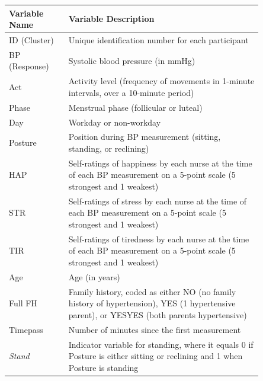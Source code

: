 \documentclass[12pt,twoside,letterpaper]{article}
\theoremstyle{definition}
\theoremstyle{definition}
\begin{document}
\begin{table} 
    \centering\begin{tabular}{|p{0.2\linewidth} | p{0.65\linewidth}|}
        \hline
        Variable Name & Variable Description \\
        \hline\hline
        ID (Cluster) & Unique identification number for each participant \\
        \hline
        BP (Response) & Systolic blood pressure (in mmHg) \\
        \hline
        \textcolor[RGB]{208, 2, 27}{Act} & Activity level (frequency of movements in 1-minute intervals, over a 10-minute period) \\
        \hline
        \textcolor[RGB]{74, 144, 226}{Phase} & Menstrual phase (follicular or luteal) \\
        \hline
        \textcolor[RGB]{74, 144, 226}{Day} & Workday or non-workday \\
        \hline
        \textcolor[RGB]{208, 2, 27}{Posture} & Position during BP measurement (sitting, standing, or reclining) \\
        \hline
        \textcolor[RGB]{208, 2, 27}{HAP} & Self-ratings of happiness by each nurse at the time of each BP measurement on a 5-point scale (5 strongest and 1 weakest) \\
        \hline
        \textcolor[RGB]{208, 2, 27}{STR} & Self-ratings of stress by each nurse at the time of each BP measurement on a 5-point scale (5 strongest and 1 weakest) \\
        \hline
        \textcolor[RGB]{208, 2, 27}{TIR} & Self-ratings of tiredness by each nurse at the time of each BP measurement on a 5-point scale (5 strongest and 1 weakest) \\
        \hline
        \textcolor[RGB]{74, 144, 226}{Age} & Age (in years) \\
        \hline
        \textcolor[RGB]{74, 144, 226}{Full FH} & Family history, coded as either NO (no family history of  hypertension), YES (1 hypertensive parent), or YESYES (both parents hypertensive) \\
        \hline
        \textcolor[RGB]{208, 2, 27}{Timepass} & Number of minutes since the first measurement \\
        \hline
        \hline\hline
        \emph{\textcolor[RGB]{208, 2, 27}{Stand}} & Indicator variable for standing, where it equals 0 if Posture is either sitting or reclining and 1 when Posture is standing \\
        \hline

\end{tabular}
\end{table}
\end{document}
